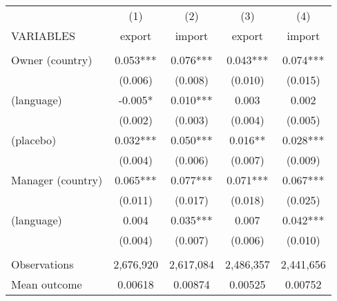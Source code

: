 \begin{tabular}{lcccc} \hline
 & (1) & (2) & (3) & (4) \\
VARIABLES & export & import & export & import \\ \hline
 &  &  &  &  \\
Owner (country) & 0.053*** & 0.076*** & 0.043*** & 0.074*** \\
 & (0.006) & (0.008) & (0.010) & (0.015) \\
(language) & -0.005* & 0.010*** & 0.003 & 0.002 \\
 & (0.002) & (0.003) & (0.004) & (0.005) \\
(placebo) & 0.032*** & 0.050*** & 0.016** & 0.028*** \\
 & (0.004) & (0.006) & (0.007) & (0.009) \\
Manager (country) & 0.065*** & 0.077*** & 0.071*** & 0.067*** \\
 & (0.011) & (0.017) & (0.018) & (0.025) \\
(language) & 0.004 & 0.035*** & 0.007 & 0.042*** \\
 & (0.004) & (0.007) & (0.006) & (0.010) \\
 &  &  &  &  \\
Observations & 2,676,920 & 2,617,084 & 2,486,357 & 2,441,656 \\
 Mean outcome & 0.00618 & 0.00874 & 0.00525 & 0.00752 \\ \hline
\end{tabular}
